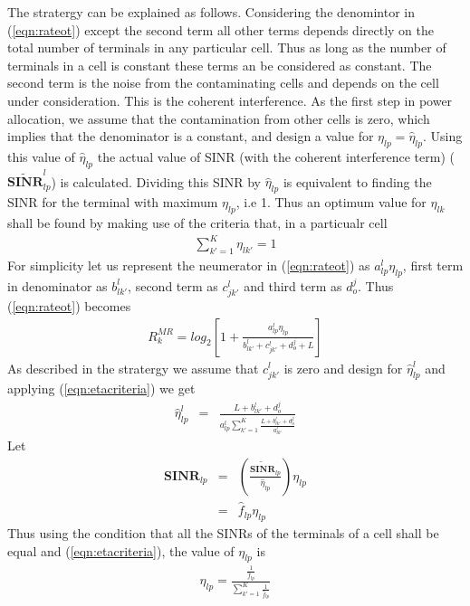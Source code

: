 \documentclass[10pt, a4paper, twoside,fleqn]{article}
\begin{document}
	The stratergy can be explained as follows. Considering the denomintor in (\ref{eqn:rateot}) except the second term all other terms depends directly on the total number of terminals in any particular cell. Thus as long as the number of terminals in a cell is constant these terms an be considered as constant. The second term is the noise from the contaminating cells and depends on the cell under consideration. This is the coherent interference. As the first step in power allocation, we assume that the contamination from other cells is zero, which implies that the denominator is a constant, and design a value for $\eta_{lp}=\hat \eta_{lp}$. Using this value of $\hat \eta_{lp}$ the actual value of SINR (with the coherent interference term) ($\pmb{\widetilde{SINR}}_{lp}^{l}$) is calculated. Dividing this SINR by $\hat \eta_{lp}$ is equivalent to finding the SINR for the terminal with maximum $\eta_{lp}$, i.e 1. Thus an optimum value for $\eta_{lk}$ shall be found by making use of the criteria that, in a particualr cell 
\begin{eqnarray}\label{eqn:etacriteria}
	\sum\limits_{k'=1}^{K}\eta_{lk'}=1
\end{eqnarray}
	For simplicity let us represent the neumerator in (\ref{eqn:rateot}) as $a_{lp}^{l}\eta_{lp} $, first term in denominator as $b_{lk'}^{l}$, second term as $c_{jk'}^{l}$ and third term as $d_{o}^{j}$. Thus (\ref{eqn:rateot}) becomes
\begin{eqnarray}
	R_k^{MR} = log_2\left[ 1+ \frac{a_{lp}^{l}\eta_{lp}}{b_{lk'}^{l}+c_{jk'}^{l}+d_{o}^{j}+L}\right]
\end{eqnarray}
 As described in the stratergy we assume that $c_{jk'}^{l}$ is zero and design for $\hat \eta_{lp}^{l}$ and applying (\ref{eqn:etacriteria}) we get
\begin{eqnarray}
	\hat \eta_{lp}^{l} &=& \frac{L+b_{lk'}^{l}+d_{o}^{j}}{a_{lp}^{l}\sum\limits_{k'=1}^{K}\frac{L+b_{lk'}^{l}+d_{o}^{j}}{a_{lk'}^{l}}}
\end{eqnarray}
Let 
\begin{eqnarray}
	\pmb{SINR}_{lp} &=& \left(\frac{\pmb{\widetilde{SINR}}_{lp}}{\hat \eta_{lp}}\right) \eta_{lp}\nonumber \\
                  &=& \hat f_{lp}\eta_{lp}
\end{eqnarray}
Thus using the condition that all the SINRs of the terminals of a cell shall be equal and (\ref{eqn:etacriteria}), the value of $\eta_{lp}$ is
\begin{eqnarray}
	\eta_{lp} = \frac{\frac{1}{\hat f_{lp}}}{\sum\limits_{k'=1}^{K}\frac{1}{\hat f_{lp}}}
\end{eqnarray}
\end{document}
